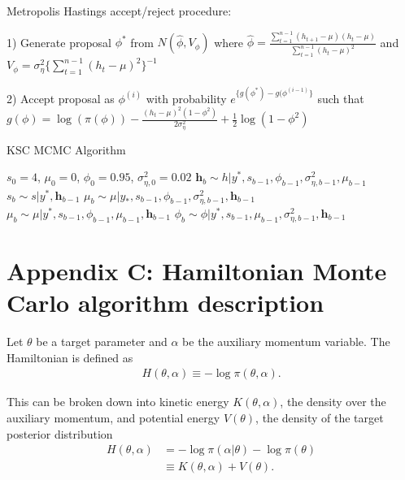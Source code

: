 \documentclass[12pt, a4paper]{article}
\begin{document}
Metropolis Hastings accept/reject procedure:

1) Generate proposal $\phi^\ast$ from $N(\hat{\phi}, V_{\phi})$ where $\hat{\phi} = \frac{\sum_{t=1}^{n-1} (h_{t+1} - \mu)(h_t - \mu)}{\sum_{t=1}^{n-1} (h_t - \mu)^2}$ and $V_{\phi} = \sigma^2_{\eta} \{\sum_{t=1}^{n-1} (h_t - \mu)^2\}^{-1}$

2) Accept proposal as $\phi^{(i)}$ with probability $e^{\{g(\phi^\ast) - g(\phi^{(i-1)}\}}$ such that $g(\phi) = \log (\pi (\phi)) - \frac {(h_t - \mu)^2 (1-\phi^2)}{2 \sigma_{\eta}^2} + \frac{1}{2} \log (1-\phi^2)$


        \begin{algorithm}[H]
            \caption{KSC MCMC Algorithm}\label{alg:ksc}
            \begin{algorithmic}
            \Require $s_0 = 4$, $\mu_0 = 0$, $\phi_0 = 0.95$, $\sigma^{2}_{\eta,0} = 0.02$
                    \State {} $\boldsymbol{h}_b \sim h|y^{\ast}, s_{b-1}, \phi_{b-1}, \sigma^{2}_{\eta,b-1}, \mu_{b-1}$ 
                    \State {} $s_b \sim s|y^{\ast}, \boldsymbol{h}_{b-1}$
                    \State {} $\mu_b \sim \mu|y_{\ast}, s_{b-1}, \phi_{b-1}, \sigma^{2}_{\eta, b-1}, \boldsymbol{h}_{b-1}$
                    \State {} $\mu_b \sim \mu|y^{\ast}, s_{b-1}, \phi_{b-1}, \mu_{b-1}, \boldsymbol{h}_{b-1}$
                    \State {} $\phi_b \sim \phi|y^{\ast}, s_{b-1}, \mu_{b-1}, \sigma^{2}_{\eta, b-1}, \boldsymbol{h}_{b-1}$
                  \EndFor
            \end{algorithmic}
            \end{algorithm}

\newpage


\section{Appendix C: Hamiltonian Monte Carlo algorithm description}
Let $\theta$ be a target parameter and $\alpha$ be the auxiliary momentum variable. The Hamiltonian is defined as
\begin{align}
H(\theta, \alpha) \equiv - \log \pi(\theta, \alpha).
\end{align}

This can be broken down into kinetic energy $K(\theta, \alpha)$, the density over the auxiliary momentum, and potential energy $V(\theta)$, the density of the target posterior distribution
\begin{align}
H(\theta, \alpha) &= - \log \pi(\alpha | \theta) - \log \pi(\theta) \\ 
&\equiv  K(\theta, \alpha) + V(\theta).
\end{align}
\end{document}
